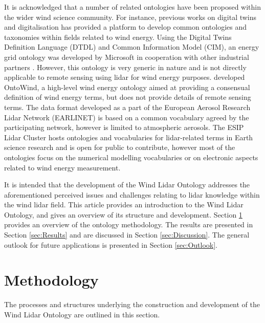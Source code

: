 \documentclass[remotesensing,article,submit,pdftex,moreauthors]{Definitions/mdpi}
\begin{document}
It is acknowledged that a number of related ontologies have been proposed within the wider wind science community.
For instance, previous works on digital twins and digitalisation has provided a platform to develop common ontologies and taxonomies within fields related to wind energy. Using the Digital Twins Definition Language (DTDL) and Common Information Model (CIM), an energy grid ontology was developed by Microsoft in cooperation with other industrial partners \cite{Ravi2021}.
However, this ontology is very generic in nature and is not directly applicable to remote sensing using lidar for wind energy purposes. \citet{Kucuk2018} developed OntoWind, a high-level wind energy ontology aimed at providing a consensual definition of wind energy terms, but does not provide details of remote sensing terms.
The data format developed as a part of the European Aerosol Research Lidar Network (EARLINET) \cite{ref-EARLINET}
is based on a common vocabulary agreed by the participating network, however is limited to atmospheric aerosols. The ESIP Lidar Cluster \cite{ref-ESIP} hosts ontologies and vocabularies for lidar-related terms in Earth science research and is open for public to contribute, however most of the ontologies focus on the numerical modelling vocabularies or on electronic aspects related to wind energy measurement. 

It is intended that the development of the Wind Lidar Ontology addresses the aforementioned perceived issues and challenges relating to lidar knowledge within the wind lidar field.
This article provides an introduction to the Wind Lidar Ontology, and gives an overview of its structure and development. Section \ref{sec:Methodology} provides an overview of the ontology methodology. The results are presented in Section \ref{sec:Results} and are discussed in Section \ref{sec:Discussion}. The general outlook for future applications is presented in Section \ref{sec:Outlook}.

\section{Methodology}
\label{sec:Methodology}
The processes and structures underlying the construction and development of the Wind Lidar Ontology are outlined in this section. 
\end{document}
